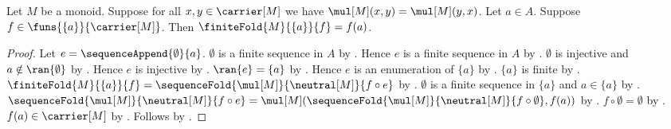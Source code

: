 \begin{proposition}\label{monoid_finite_fold_singleton}
    Let $M$ be a monoid.
    Suppose for all $x,y\in\carrier[M]$ we have
        $\mul[M](x,y)=\mul[M](y,x)$.
    Let $a\in A$.
    Suppose $f\in\funs{\{a\}}{\carrier[M]}$.
    Then $\finiteFold{M}{\{a\}}{f}=f(a)$.
\end{proposition}
\begin{proof}
    Let $e=\sequenceAppend{\emptyset}{a}$.
    $\emptyset$ is a finite sequence in $A$ by
        .
    Hence $e$ is a finite sequence in $A$ by
        .
    $\emptyset$ is injective and $a\notin\ran{\emptyset}$ by
        .
    Hence $e$ is injective by
        .
    $\ran{e}=\{a\}$ by
        .
    Hence $e$ is an enumeration of $\{a\}$ by
        .
    $\{a\}$ is finite by .
    $\finiteFold{M}{\{a\}}{f}
        =\sequenceFold{\mul[M]}{\neutral[M]}{f\circ e}$ by
        .
    $\emptyset$ is a finite sequence in $\{a\}$ and $a\in\{a\}$ by
        .
    $\sequenceFold{\mul[M]}{\neutral[M]}{f\circ e}
        =\mul[M](
            \sequenceFold{\mul[M]}{\neutral[M]}{f\circ\emptyset},
            f(a))$ by .
    $f\circ\emptyset=\emptyset$ by
        .
    $f(a)\in\carrier[M]$ by .
    Follows by
        .
\end{proof}

